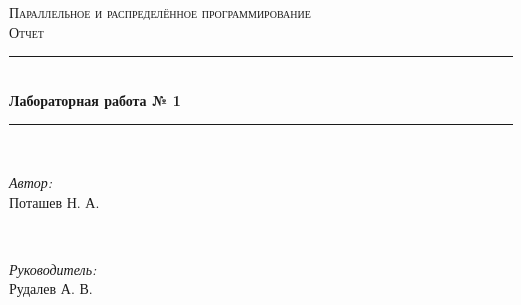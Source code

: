 \documentclass[12pt]{article}
\begin{document}
\begin{titlepage}

\newcommand{\HRule}{\rule{\linewidth}{0.5mm}} 
\centering 
\textsc{\LARGE Параллельное и распределённое программирование }\\[0.5cm] 
\textsc{\Large Отчет }\\[0.5cm] 
\HRule \\[0.4cm]
{ \huge \bfseries Лабораторная работа № 1}\\[0.4cm]
\HRule \\[1.5cm]

\begin{minipage}{0.4\textwidth}
\begin{flushleft} \large
\emph{Автор:}\\
Поташев Н. А.\\
\end{flushleft}
\end{minipage}
~
\begin{minipage}{0.4\textwidth}
\begin{flushright} \large
\emph{Руководитель:} \\
Рудалев А. В.
\end{flushright}
\end{minipage}\\[2cm]


\end{titlepage}
\end{document}
